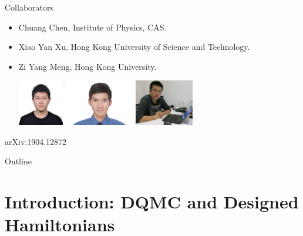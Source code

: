 \documentclass[xcolor=table, 10pt, aspectratio=43]{beamer}
\begin{document}
\begin{frame}{Collaborators}
\begin{itemize}
\item Chuang Chen, Institute of Physics, CAS.
\item Xiao Yan Xu, Hong Kong University of Science and Technology.
\item Zi Yang Meng, Hong Kong University.
\begin{center}
  \includegraphics[height=2cm]{../people/chuangchen}
  \includegraphics[height=2cm]{../people/xiaoyanxu}
  \includegraphics[height=2cm]{../people/ziyangmeng}
\end{center}
\end{itemize}
\begin{center}
  \small arXiv:1904.12872
\end{center}
\end{frame}

\begin{frame}{Outline}
		\tableofcontents
\end{frame}

\section{Introduction: DQMC and Designed Hamiltonians}
\end{document}
